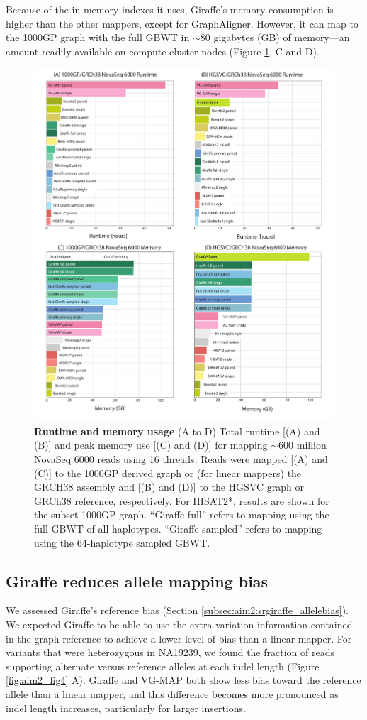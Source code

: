 \documentclass[11pt]{ucscthesis}
\begin{document}
Because of the in-memory indexes it uses, Giraffe’s memory consumption is higher than the other mappers, except for GraphAligner.
However, it can map to the 1000GP graph with the full GBWT in $\sim$80 gigabytes (GB) of memory—an amount readily available on compute cluster nodes (Figure \ref{fig:aim2_fig3}, C and D).

\begin{figure}
    \centering
    \includegraphics[width=.8\linewidth]{aim2_fig3.pdf}
    \caption[Runtime and memory usage]{\textbf{Runtime and memory usage} (A to D) Total runtime [(A) and (B)] and peak memory use [(C) and (D)] for mapping $\sim$600 million NovaSeq 6000 reads using 16 threads. Reads were mapped [(A) and (C)] to the 1000GP derived graph or (for linear mappers) the GRCH38 assembly and [(B) and (D)] to the HGSVC graph or GRCh38 reference, respectively. For HISAT2*, results are shown for the subset 1000GP graph. “Giraffe full” refers to mapping using the full GBWT of all haplotypes. “Giraffe sampled” refers to mapping using the 64-haplotype sampled GBWT.}
    \label{fig:aim2_fig3}
\end{figure}

\subsection{Giraffe reduces allele mapping bias}
We assessed Giraffe’s reference bias (Section \ref{subsec:aim2:srgiraffe_allelebias}).
We expected Giraffe to be able to use the extra variation information contained in the graph reference to achieve a lower level of bias than a linear mapper.
For variants that were heterozygous in NA19239, we found the fraction of reads supporting alternate versus reference alleles at each indel length (Figure \ref{fig:aim2_fig4} A).
Giraffe and VG-MAP both show less bias toward the reference allele than a linear mapper, and this difference becomes more pronounced as indel length increases, particularly for larger insertions.
\end{document}
